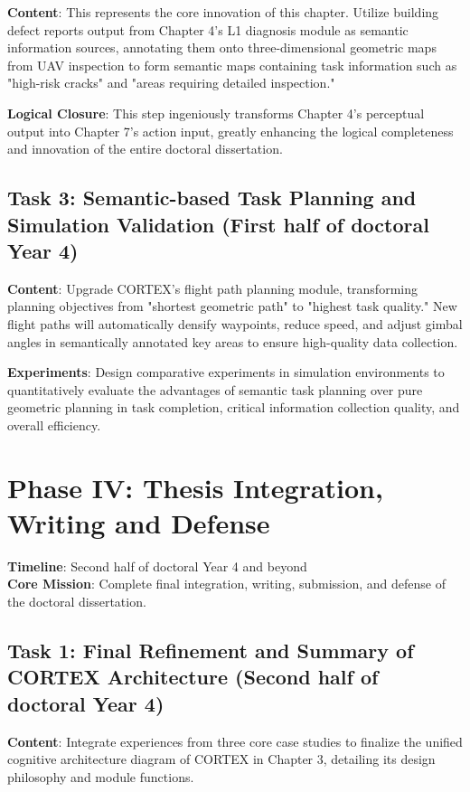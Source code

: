 \textbf{Content}: This represents the core innovation of this chapter. Utilize building defect reports output from Chapter 4's L1 diagnosis module as semantic information sources, annotating them onto three-dimensional geometric maps from UAV inspection to form semantic maps containing task information such as "high-risk cracks" and "areas requiring detailed inspection."

\textbf{Logical Closure}: This step ingeniously transforms Chapter 4's perceptual output into Chapter 7's action input, greatly enhancing the logical completeness and innovation of the entire doctoral dissertation.

\subsection{Task 3: Semantic-based Task Planning and Simulation Validation (First half of doctoral Year 4)}

\textbf{Content}: Upgrade CORTEX's flight path planning module, transforming planning objectives from "shortest geometric path" to "highest task quality." New flight paths will automatically densify waypoints, reduce speed, and adjust gimbal angles in semantically annotated key areas to ensure high-quality data collection.

\textbf{Experiments}: Design comparative experiments in simulation environments to quantitatively evaluate the advantages of semantic task planning over pure geometric planning in task completion, critical information collection quality, and overall efficiency.

\section{Phase IV: Thesis Integration, Writing and Defense}

\textbf{Timeline}: Second half of doctoral Year 4 and beyond\\
\textbf{Core Mission}: Complete final integration, writing, submission, and defense of the doctoral dissertation.

\subsection{Task 1: Final Refinement and Summary of CORTEX Architecture (Second half of doctoral Year 4)}

\textbf{Content}: Integrate experiences from three core case studies to finalize the unified cognitive architecture diagram of CORTEX in Chapter 3, detailing its design philosophy and module functions.


